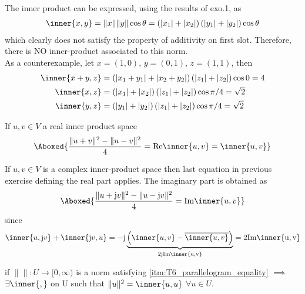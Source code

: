 The inner product can be expressed, using the results of exo.1, as
\begin{align*}
\inner{x,y} = \|x\|\|y\|\cos\theta = \left(|x_1| + |x_2|\right)\left(|y_1| + |y_2|\right)\cos\theta
\end{align*}
which clearly does not satisfy the property of additivity on first slot. Therefore, there is NO inner-product associated to this norm.\\
As a counterexample, let $x=(1,0)$, $y=(0,1)$, $z=(1,1)$, then
\begin{align*}
\inner{x+y,z} &= \left(|x_1+y_1| + |x_2+y_2| \right)\left(|z_1|+|z_2|\right)\cos0 = 4 \\
\inner{x,z} &= \left(|x_1| + |x_2| \right)\left(|z_1|+|z_2|\right)\cos\pi/4 = \sqrt{2} \\
\inner{y,z} &= \left(|y_1| + |y_2| \right)\left(|z_1|+|z_2|\right)\cos\pi/4 = \sqrt{2} 
\end{align*}


\exo{} If $u,v\in V$ a real inner product space
\begin{align*}
\Aboxed{
\frac{\|u+v\|^2-\|u-v\|^2}{4}= \mathrm{Re}\inner{u,v} = \inner{u,v}}
\end{align*}

\exo{} If $u,v\in V$ is a complex inner-product space then last equation in previous exercise defining the real part applies. The imaginary part is obtained as
\begin{align*}
\Aboxed{\frac{\|u+\mathrm{j}v\|^2-\|u-\mathrm{j}v\|^2}{4}=\mathrm{Im}\inner{u,v}}
\end{align*}
since 
\begin{align*}
\inner{u,\mathrm{j}v} + \inner{\mathrm{j}v, u}= -\mathrm{j} \underbrace{\left( \inner{u,v} - \overline{\inner{u,v}} \right)}_{2\mathrm{jIm}\mathrm{\inner{u,v}}} = 2\mathrm{Im}\mathrm{\inner{u,v}}
\end{align*}

\exo{}\label{exo:6_8} if $\|\|:U\to[0,\infty)$ is a norm satisfying \ref{itm:T6_parallelogram_equality} 
$\implies$ $\exists \inner{,}$ on U such that $\|u\|^2 = \inner{u,u}$  $\forall u\in U$.
 
